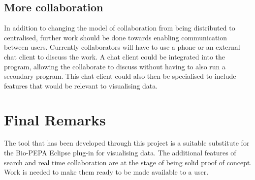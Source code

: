 \subsection{More collaboration}
In addition to changing the model of collaboration from being distributed to centralised, further work should be done towards enabling communication between users.  Currently collaborators will have to use a phone or an external chat client to discuss the work.  A chat client could be integrated into the program, allowing the collaborate to discuss without having to also run a secondary program.  This chat client could also then be specialised to include features that would be relevant to visualising data.

\section{Final Remarks}

The tool that has been developed through this project is a suitable substitute for the Bio-PEPA Eclipse plug-in for visualising data.  The additional features of search and real time collaboration are at the stage of being solid proof of concept.  Work is needed to make them ready to be made available to a user.
